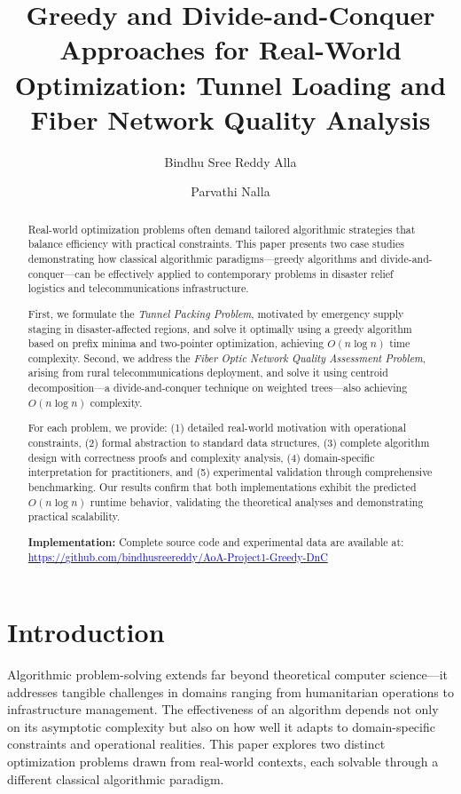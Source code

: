 \documentclass[sigconf]{acmart}
\title{Greedy and Divide-and-Conquer Approaches for Real-World Optimization: Tunnel Loading and Fiber Network Quality Analysis}
\author{Bindhu Sree Reddy Alla}
\affiliation{\institution{University of Florida}\city{Gainesville}\country{USA}}
\author{Parvathi Nalla}
\affiliation{\institution{University of Florida}\city{Gainesville}\country{USA}}
\begin{document}
\begin{abstract}
Real-world optimization problems often demand tailored algorithmic strategies that balance efficiency with practical constraints. This paper presents two case studies demonstrating how classical algorithmic paradigms—greedy algorithms and divide-and-conquer—can be effectively applied to contemporary problems in disaster relief logistics and telecommunications infrastructure.

First, we formulate the \emph{Tunnel Packing Problem}, motivated by emergency supply staging in disaster-affected regions, and solve it optimally using a greedy algorithm based on prefix minima and two-pointer optimization, achieving $O(n \log n)$ time complexity. Second, we address the \emph{Fiber Optic Network Quality Assessment Problem}, arising from rural telecommunications deployment, and solve it using centroid decomposition—a divide-and-conquer technique on weighted trees—also achieving $O(n \log n)$ complexity.

For each problem, we provide: (1) detailed real-world motivation with operational constraints, (2) formal abstraction to standard data structures, (3) complete algorithm design with correctness proofs and complexity analysis, (4) domain-specific interpretation for practitioners, and (5) experimental validation through comprehensive benchmarking. Our results confirm that both implementations exhibit the predicted $O(n \log n)$ runtime behavior, validating the theoretical analyses and demonstrating practical scalability.

\textbf{Implementation:} Complete source code and experimental data are available at: \href{https://github.com/bindhusreereddy/AoA-Project1-Greedy-DnC}{\textcolor{blue}{https://github.com/bindhusreereddy/AoA-Project1-Greedy-DnC}}
\end{abstract}


\maketitle

\section{Introduction}

Algorithmic problem-solving extends far beyond theoretical computer science—it addresses tangible challenges in domains ranging from humanitarian operations to infrastructure management. The effectiveness of an algorithm depends not only on its asymptotic complexity but also on how well it adapts to domain-specific constraints and operational realities. This paper explores two distinct optimization problems drawn from real-world contexts, each solvable through a different classical algorithmic paradigm.
\end{document}
